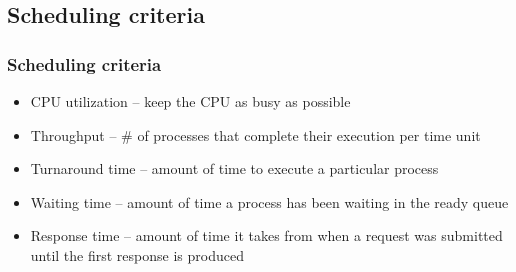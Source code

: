 \documentclass[CJKutf8,xcolor=pdftex,dvipsnames,table]{beamer}
\begin{document}
\begin{CJK*}{UTF8}{song}

  
  \subsection{Scheduling criteria}

  \begin{frame}
  \frametitle{Scheduling criteria} \pause
  \begin{itemize}
  \item{CPU utilization \pause –  keep the CPU as busy as possible} \pause
  \item{Throughput \pause –  \# of processes that complete their execution per time unit} \pause
  \item{Turnaround time \pause –  amount of time to execute a particular process} \pause
  \item{Waiting time \pause –  amount of time a process has been waiting in the ready queue} \pause
  \item{Response time \pause –  amount of time it takes from when a request was submitted until the first response is produced}
  \end{itemize}
  \end{frame}
  

\end{CJK*}
\end{document}
